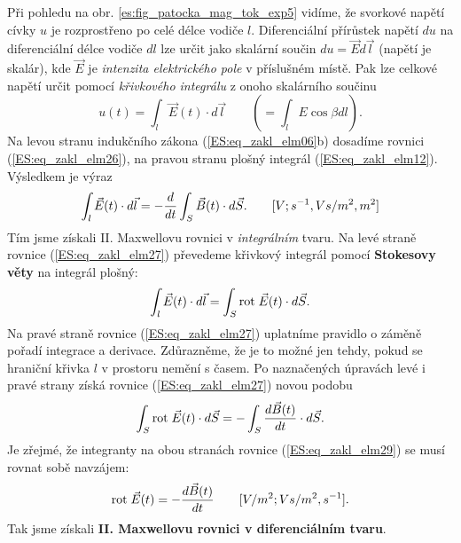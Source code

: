       Při pohledu na obr. \ref{es:fig_patocka_mag_tok_exp5} vidíme, že svorkové napětí cívky \(u\) 
      je rozprostřeno po celé délce vodiče \(l\). Diferenciální přírůstek napětí \(du \) na 
      diferenciální délce vodiče \(dl\) lze určit jako skalární součin \(du = \vec{E}d\vec{l}\) 
      (napětí je skalár), kde \(\vec{E}\) je \emph{intenzita elektrického pole} v příslušném místě. 
      Pak lze celkové napětí určit pomocí \emph{křivkového integrálu} z onoho skalárního součinu
      \begin{equation}\label{ES:eq_zakl_elm26}
        u(t) = \int_{l}\vec{E}(t)\cdot d\vec{l} \qquad (=\int_lE\cos\beta dl).
      \end{equation}
      Na levou stranu indukčního zákona (\ref{ES:eq_zakl_elm06}b) dosadíme rovnici 
      (\ref{ES:eq_zakl_elm26}), na pravou stranu plošný integrál (\ref{ES:eq_zakl_elm12}). 
      Výsledkem je výraz
      \begin{equation}\label{ES:eq_zakl_elm27}
        \int_{l}\vec{E}(t)\cdot d\vec{l} = -\dfrac{d }{d t}\int_{S}\vec{B}(t)\cdot d\vec{S}.
        \qquad [V;s^{-1},Vs/m^2,m^2]
      \end{equation}
      Tím jsme získali II. Maxwellovu rovnici v \emph{integrálním} tvaru. Na levé straně rovnice 
      (\ref{ES:eq_zakl_elm27}) převedeme křivkový integrál pomocí \textbf{Stokesovy věty} na 
      integrál plošný:
      \begin{equation}\label{ES:eq_zakl_elm28}
        \int_{l}\vec{E}(t)\cdot d\vec{l} = \int_{S}\mathrm{rot}\;\vec{E}(t)\cdot d\vec{S}.
      \end{equation}
      Na pravé straně rovnice (\ref{ES:eq_zakl_elm27}) uplatníme pravidlo o záměně pořadí integrace 
      a derivace. Zdůrazněme, že je to možné jen tehdy, pokud se hraniční křivka \(l\) v prostoru 
      nemění s časem. Po naznačených úpravách levé i pravé strany získá rovnice 
      (\ref{ES:eq_zakl_elm27}) novou podobu
      \begin{equation}\label{ES:eq_zakl_elm29}
        \int_{S}\mathrm{rot}\;\vec{E}(t)\cdot d\vec{S} = -\int_{S}\dfrac{d \vec{B}(t)}{d t}\cdot d\vec{S}.
      \end{equation}
      Je zřejmé, že integranty na obou stranách rovnice (\ref{ES:eq_zakl_elm29}) se musí rovnat 
      sobě navzájem:
      \begin{equation}\label{ES:eq_zakl_elm30}
        \mathrm{rot}\;\vec{E}(t) = -\dfrac{d \vec{B}(t)}{d t} \qquad [V/m^2;Vs/m^2,s^{-1}].
      \end{equation}
      Tak jsme získali \textbf{II. Maxwellovu rovnici v diferenciálním tvaru}.
      

